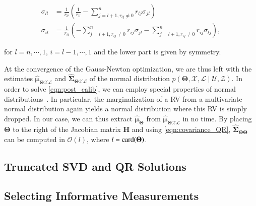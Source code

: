 \begin{equation}\label{eqn:covariance_QR}
  \begin{aligned}
  \sigma_{ll} &= \frac{1}{r_{ll}}(\frac{1}{r_{ll}} -
    \sum_{j = l + 1, r_{lj}\neq 0}^n r_{lj}\sigma_{jl})\\
  \sigma_{il} &= \frac{1}{r_{ii}}
    (-\sum_{j = i + 1, r_{ij}\neq 0}^n r_{ij}\sigma_{jl} -
    \sum_{j = l + 1, r_{ij}\neq 0}^n r_{ij}\sigma_{lj}),
  \end{aligned}
\end{equation}

for $l=n,\cdots,1$, $i=l-1,\cdots,1$ and the lower part is given by symmetry.

At the convergence of the Gauss-Newton optimization, we are thus left with the
estimates $\hat{\boldsymbol{\mu}}_{\boldsymbol{\Theta}\mathcal{X}\mathcal{L}}$
and $\hat{\boldsymbol{\Sigma}}_{\boldsymbol{\Theta}\mathcal{X}\mathcal{L}}$ of
the normal distribution $p(\boldsymbol{\Theta}, \mathcal{X},\mathcal{L}
\mid\mathcal{U},\mathcal{Z})$. In order to solve \eqref{eqn:post_calib}, we can
employ special properties of normal distributions~\cite{bishop06pattern}.
In particular, the marginalization of a RV from a multivariate normal
distribution again yields a normal distribution where this RV is simply dropped.
In our case, we can thus extract $\hat{\boldsymbol{\mu}}_{\boldsymbol{\Theta}}$
from $\hat{\boldsymbol{\mu}}_{\boldsymbol{\Theta}\mathcal{X}\mathcal{L}}$ in no
time. By placing $\boldsymbol{\Theta}$ to the right of the Jacobian matrix
$\mathbf{H}$ and using \eqref{eqn:covariance_QR},
$\hat{\boldsymbol{\Sigma}}_{\boldsymbol{\Theta}\boldsymbol{\Theta}}$ can be
computed in $\mathcal{O}(l)$, where $l=\operatorname{card}(\boldsymbol{\Theta})$.

\subsection{Truncated SVD and QR Solutions}

\subsection{Selecting Informative Measurements}

